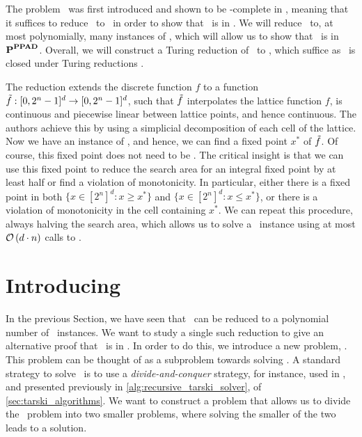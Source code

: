 The problem \Brouwer\ was first introduced and shown to be \PPAD-complete in , meaning that it suffices to reduce \Tarski\ to \Brouwer\ in order to show that \Tarski\ is in \PPAD. We will reduce \Tarski\ to, at most polynomially, many instances of \Brouwer, which will allow us to show that \Tarski\ is in $\textbf{P}^{\textbf{PPAD}}$. Overall, we will construct a Turing reduction of \Tarski\ to \Brouwer, which suffice as \PPAD\ is closed under Turing reductions .

The reduction extends the discrete function $f$ to a function $\Tilde{f} : [0, 2^n - 1]^d \rightarrow [0, 2^n - 1]^d$, such that $\Tilde{f}$ interpolates the lattice function $f$, is continuous and piecewise linear between lattice points, and hence continuous. The authors achieve this by using a simplicial decomposition of each cell of the lattice. Now we have an instance of \Brouwer, and hence, we can find a fixed point $x^*$ of $\Tilde{f}$. Of course, this fixed point does not need to be 
.
The critical insight is that we can use this fixed point to reduce the search area for an integral fixed point by at least half or find a violation of monotonicity. In particular, either there is a fixed point in both $\{x \in [2^n]^d : x \geq x^*\}$ and $\{x \in [2^n]^d : x \leq x^*\}$, or there is a violation of monotonicity in the cell containing $x^*$.
We can repeat this procedure, always halving the search area, which allows us to solve a \Tarski\ instance using at most $\mathcal{O}\left(d \cdot n\right)$ calls to \Brouwer.

\section{Introducing \Tarskistar}

In the previous Section, we have seen that \Tarski\ can be reduced to a polynomial number of \Brouwer\ instances. We want to study a single such reduction to give an alternative proof that \Tarski\ is in \PPAD. In order to do this, we introduce a new problem, \Tarskistar. This problem can be thought of as a subproblem towards solving \Tarski. A standard strategy to solve \Tarski\ is to use a \emph{divide-and-conquer} strategy, for instance, used in , and presented previously in \cref{alg:recursive_tarski_solver}, of \cref{sec:tarski_algorithms}. We want to construct a problem that allows us to divide the \Tarski\ problem into two smaller problems, where solving the smaller of the two leads to a solution.

